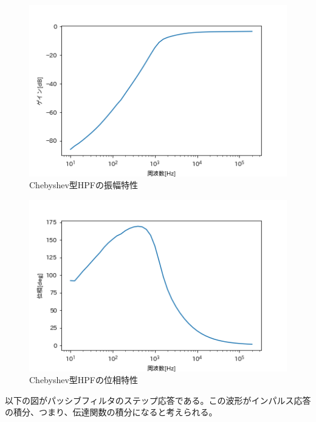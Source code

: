 \documentclass[dvipdfmx, twocolumn]{jsarticle}
\begin{document}
\begin{enumerate}
\begin{itemize}
\begin{figure}[H]
\begin{center}
\includegraphics[scale = 0.5]{CGHPF.png}
\caption{Chebyshev型HPFの振幅特性}
\end{center}
\end{figure}

\begin{figure}[H]
\begin{center}
\includegraphics[scale = 0.5]{CPHPF.png}
\caption{Chebyshev型HPFの位相特性}
\end{center}
\end{figure}


以下の図がパッシブフィルタのステップ応答である。この波形がインパルス応答の積分、つまり、伝達関数の積分になると考えられる。



\end{itemize}
\end{enumerate}
\end{document}
